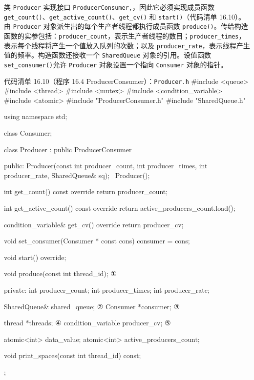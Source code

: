 类 \texttt{Producer} 实现接口 \texttt{Producer\allowbreak{}Consumer,\allowbreak{}}，因此它必须实现成员函数 \texttt{get\_\allowbreak{}count(\allowbreak{})\allowbreak{}}、\texttt{get\_\allowbreak{}active\_\allowbreak{}count(\allowbreak{})\allowbreak{}}、\texttt{get\_cv()} 和 \texttt{start()}（代码清单 16.10）。由 \texttt{Producer} 对象派生出的每个生产者线程都执行成员函数 \texttt{produce()}。传给构造函数的实参包括：\texttt{producer\_\allowbreak{}count}，表示生产者线程的数目；\texttt{producer\_\allowbreak{}times}，表示每个线程将产生一个值放入队列的次数；以及 \texttt{producer\_\allowbreak{}rate}，表示线程产生值的频率。构造函数还接收一个 \texttt{Shared\allowbreak{}Queue} 对象的引用。设值函数 \texttt{set\_\allowbreak{}consumer(\allowbreak{})\allowbreak{}}允许 \texttt{Producer} 对象设置一个指向 \texttt{Consumer} 对象的指针。

\begin{codeboxt}{代码清单 16.10（程序 16.4 ProducerConsumer）：\texttt{Producer.\allowbreak{}h}}
#include <queue>
#include <thread>
#include <mutex>
#include <condition_variable>
#include <atomic>
#include "ProducerConsumer.h"
#include "SharedQueue.h"

using namespace std;

class Consumer;

class Producer : public ProducerConsumer
{
public:
    Producer(const int producer_count, int producer_times,
             int producer_rate, SharedQueue& sq);
    ~Producer();

    int get_count() const override { return producer_count; }

    int get_active_count() const override
    {
        return active_producers_count.load();
    }

    condition_variable& get_cv() override { return producer_cv; }

    void set_consumer(Consumer * const cons)
    {
        consumer = cons;
    }

    void start() override;

    void produce(const int thread_id);    ①

private:
    int producer_count;
    int producer_times;
    int producer_rate;

    SharedQueue& shared_queue;            ②
    Consumer *consumer;                   ③

    thread *threads;                      ④
    condition_variable producer_cv;       ⑤

    atomic<int> data_value;
    atomic<int> active_producers_count;

    void print_spaces(const int thread_id) const;
};
\end{codeboxt}
\par
{}\par
{}\par
{}\par
{}\par

